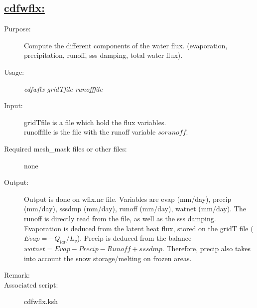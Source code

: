 \documentclass[a4paper,11pt]{article}
\begin{document}
\subsection*{\underline{cdfwflx:}}
\begin{description}
\item[Purpose:] Compute the different components of the water flux. (evaporation, precipitation, runoff, sss damping, total
  water flux).
\item[Usage:] {\em cdfwflx gridTfile runofffile}
\item[Input:] gridTfile is a file which hold the flux variables.\\
              runofffile is the file with the runoff variable $sorunoff$.
\item[Required mesh\_mask files or other files:]  none
\item[Output:] Output is done on wflx.nc file. Variables are evap (mm/day), precip (mm/day), sssdmp (mm/day), runoff (mm/day),
     watnet (mm/day). The runoff is directly read from the file, as well as the sss damping. Evaporation is deduced from the
latent heat flux, stored on the gridT file ($Evap=-Q_{lat}/L_v$). Precip is deduced from the balance $watnet=Evap -Precip -Runoff +sssdmp$. Therefore, precip also takes into account the snow storage/melting on frozen areas.
\item[Remark:] 
\item[Associated script:] cdfwflx.ksh
\end{description}
\end{document}

